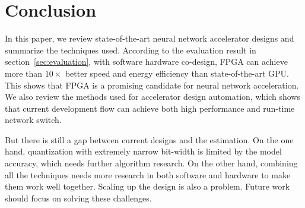 \section{Conclusion}\label{sec:conclusion}

In this paper, we review state-of-the-art neural network accelerator designs and summarize the techniques used. According to the evaluation result in section~\ref{sec:evaluation}, with software hardware co-design, FPGA can achieve more than $10\times$ better speed and energy efficiency than state-of-the-art GPU. This shows that FPGA is a promising candidate for neural network acceleration. We also review the methods used for accelerator design automation, which shows that current development flow can achieve both high performance and run-time network switch.

But there is still a gap between current designs and the estimation. On the one hand, quantization with extremely narrow bit-width is limited by the model accuracy, which needs further algorithm research. On the other hand, combining all the techniques needs more research in both software and hardware to make them work well together. Scaling up the design is also a problem. Future work should focus on solving these challenges. 